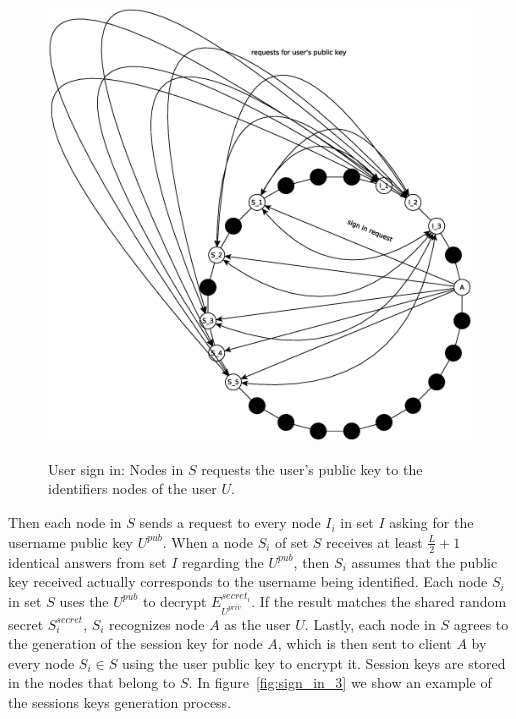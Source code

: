 \begin{figure}[!htb]
\centering
\includegraphics[width=14cm]{../img/sign_in_2}\\
\caption{User sign in: Nodes in $S$ requests the user's public key to the
identifiers nodes of the user $U$.}
\label{fig:sign_in_2}
\end{figure}

Then each node in $S$ sends a request to every node $I_i$ in set $I$ asking for the username public key $U^{pub}$. When a node
$S_i$ of set $S$ receives at least $\frac{L}{2} + 1$ identical answers from
set $I$ regarding the $U^{pub}$, then $S_i$ assumes that the public key received
actually corresponds to the username being identified. Each node $S_i$ in set $S$
uses the $U^{pub}$ to decrypt $E^{secret_i}_{U^{priv}}$. If the result matches
the shared random secret $S^{secret}_i$, $S_i$ recognizes node $A$ as the
user $U$.
Lastly, each node in $S$ agrees to the generation of the session key for 
node $A$, which is then sent to client $A$ by every node $S_i \in S$ using
the user public key to encrypt it. Session keys are stored in the
nodes that belong to $S$. In figure~\ref{fig:sign_in_3} we show an example of
the sessions keys generation process.

